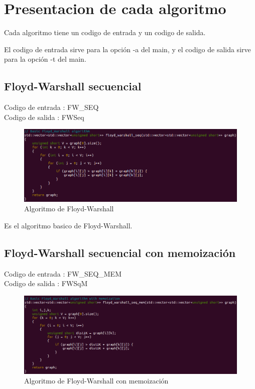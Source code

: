 \documentclass[a4paper,11pt]{article}
\begin{document}
\section{Presentacion de cada algoritmo}

Cada algoritmo tiene un codigo de entrada y un codigo de salida.

El codigo de entrada sirve para la opción -a del main, y el codigo de salida sirve para la opción -t del main.

\subsection{Floyd-Warshall secuencial}

\noindent Codigo de entrada : FW\_SEQ \\
Codigo de salida : FWSeq

\begin{figure}[H]
\begin{center}
  \includegraphics[scale=0.7]{FW_SEQ.png}
  \caption{Algoritmo de Floyd-Warshall}
\end{center}
\end{figure}

Es el algoritmo basico de Floyd-Warshall.

\subsection{Floyd-Warshall secuencial con memoización}

\noindent Codigo de entrada : FW\_SEQ\_MEM \\
Codigo de salida : FWSqM

\begin{figure}[H]
\begin{center}
  \includegraphics[scale=0.6]{FW_SEQ_MEM.png}
  \caption{Algoritmo de Floyd-Warshall con memoización}
\end{center}
\end{figure}
\end{document}
